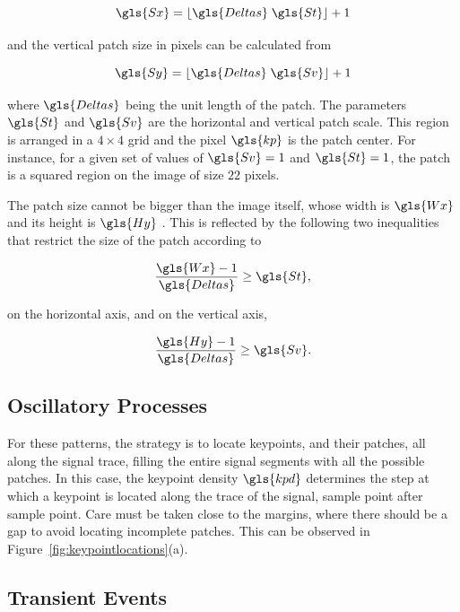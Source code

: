 \begin{equation}
\gls{Sx} = \lfloor \gls{Deltas} \; \gls{St} \rfloor + 1
\label{eq:sx}
\end{equation}

\noindent and the vertical patch size in pixels can be calculated from

\begin{equation}
\gls{Sy} = \lfloor \gls{Deltas} \; \gls{Sv} \rfloor + 1
\label{eq:sy}
\end{equation}

\noindent where $\gls{Deltas}$ being the unit length of the patch. The parameters $\gls{St}$  and $\gls{Sv}$ are the horizontal and vertical patch scale. This region is arranged in a $4 \times 4$ grid and the pixel $\gls{kp}$ is the patch center.   For instance, for a given set of values of $\gls{Sv} = 1$ and $\gls{St} = 1$, the patch is a squared region on the image of size $22$ pixels.

The patch size cannot be bigger than the image itself, whose width is $\gls{Wx}$ and its height is $\gls{Hy}$ .  This is reflected by the following two inequalities that restrict the size of the patch according to 

\begin{equation}
\frac{\gls{Wx}-1}{\gls{Deltas}}  \geq \gls{St} ,
\label{eq:restriction1}
\end{equation}

\noindent on the horizontal axis, and on the vertical axis, 

\begin{equation}
\frac{\gls{Hy}-1}{\gls{Deltas}}  \geq \gls{Sv}.
\label{eq:restriction2}
\end{equation}

\subsection{Oscillatory Processes}

For these patterns, the strategy is to locate keypoints, and their patches, all along the signal trace, filling the entire signal segments with all the possible patches.  In this case, the keypoint density $\gls{kpd} $ determines the step at which a keypoint is located along the trace of the signal, sample point after sample point. Care must be taken close to the margins, where there should be a gap to avoid locating incomplete patches.  This can be observed in Figure~\ref{fig:keypointlocations}(a).

\subsection{Transient Events}

